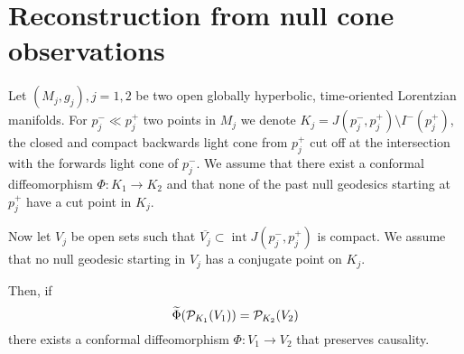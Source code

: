 \section{Reconstruction from null cone observations}

\begin{theorem}\label{thm:babycase}
Let $(M_j,g_j), j=1,2$ be two open globally hyperbolic, time-oriented Lorentzian manifolds. For $p_j^-\ll p_j^+$ two points in $M_j$ we denote $K_j = J(p_j^-,p_j^+) \setminus I^-(p^+_j)$, the closed and compact backwards light cone from $p_j^+$ cut off at the intersection with the forwards light cone of $p_j^-$. We assume that there exist a conformal diffeomorphism $\Phi:K_1\to K_2$ and that none of the past null geodesics starting at $p_j^+$ have a cut point in $K_j$. 

Now let $V_j$ be open sets such that $\overline{V_j}\subset \operatorname{int} J(p_j^-,p_j^+)$ is compact. We assume that no null geodesic starting in $V_j$ has a conjugate point on $K_j$. 

Then, if 
\[
\widetilde{\Phi}(\mathcal{P}_{K_1}(V_1)) = \mathcal{P}_{K_2}(V_2)
\]
there exists a conformal diffeomorphism $\Phi:V_1\to V_2$ that preserves causality.
\end{theorem}


